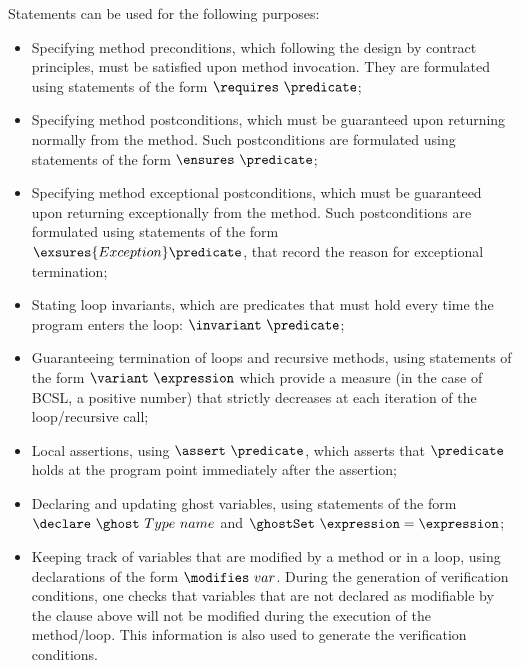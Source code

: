 Statements can be used for the following purposes:
\begin{itemize}
\item Specifying method preconditions, which following the design by
contract principles, must be satisfied upon method invocation. They
are formulated using statements of the form $\requires \ \predicate$;


\item Specifying method postconditions, which must be guaranteed upon
returning normally from the method. Such postconditions are formulated
using statements of the form $\ensures\ \predicate$;

\item Specifying method exceptional postconditions, which must be
guaranteed upon returning exceptionally from the method. Such
postconditions are formulated using statements of the form \\
$\exsures{Exception} \predicate$, that record the reason for
exceptional termination;

\item Stating loop invariants, which are predicates that must hold
every time the program enters the loop: $\invariant\ \predicate$;

\item Guaranteeing termination of loops and recursive methods, using
statements of the form $\variant\ \expression$ which provide a measure (in
the case of BCSL, a positive number) that strictly decreases at each
iteration of the loop/recursive call;


\item Local assertions, using $\assert \ \predicate$, which asserts
that $\predicate$ holds at the program point immediately after the
assertion;

\item Declaring and updating ghost variables, using statements of the
form $\declare \ \ghost \ Type \ name$ and $ \ghostSet \ \expression =
\expression$;


\item Keeping track of variables that are modified by a method or in a
loop, using declarations of the form $\modifies \ var$. During the
generation of verification conditions, one checks that variables that
are not declared as modifiable by the clause above will not be
modified during the execution of the method/loop. This information is
also used to generate the verification conditions.
\end{itemize}

